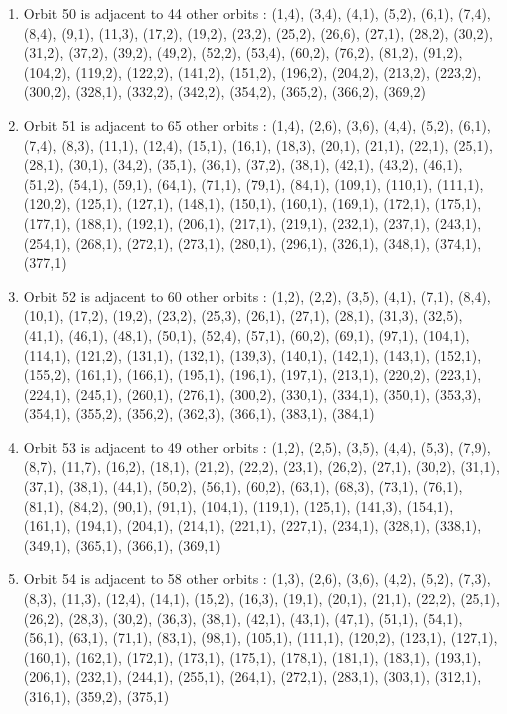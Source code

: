 \documentclass[12pt]{article}
\begin{document}
\begin{enumerate}
\item Orbit 50 is adjacent to 44 other orbits : (1,4), (3,4), (4,1), (5,2), (6,1), (7,4), (8,4), (9,1), (11,3), (17,2), (19,2), (23,2), (25,2), (26,6), (27,1), (28,2), (30,2), (31,2), (37,2), (39,2), (49,2), (52,2), (53,4), (60,2), (76,2), (81,2), (91,2), (104,2), (119,2), (122,2), (141,2), (151,2), (196,2), (204,2), (213,2), (223,2), (300,2), (328,1), (332,2), (342,2), (354,2), (365,2), (366,2), (369,2)
\item Orbit 51 is adjacent to 65 other orbits : (1,4), (2,6), (3,6), (4,4), (5,2), (6,1), (7,4), (8,3), (11,1), (12,4), (15,1), (16,1), (18,3), (20,1), (21,1), (22,1), (25,1), (28,1), (30,1), (34,2), (35,1), (36,1), (37,2), (38,1), (42,1), (43,2), (46,1), (51,2), (54,1), (59,1), (64,1), (71,1), (79,1), (84,1), (109,1), (110,1), (111,1), (120,2), (125,1), (127,1), (148,1), (150,1), (160,1), (169,1), (172,1), (175,1), (177,1), (188,1), (192,1), (206,1), (217,1), (219,1), (232,1), (237,1), (243,1), (254,1), (268,1), (272,1), (273,1), (280,1), (296,1), (326,1), (348,1), (374,1), (377,1)
\item Orbit 52 is adjacent to 60 other orbits : (1,2), (2,2), (3,5), (4,1), (7,1), (8,4), (10,1), (17,2), (19,2), (23,2), (25,3), (26,1), (27,1), (28,1), (31,3), (32,5), (41,1), (46,1), (48,1), (50,1), (52,4), (57,1), (60,2), (69,1), (97,1), (104,1), (114,1), (121,2), (131,1), (132,1), (139,3), (140,1), (142,1), (143,1), (152,1), (155,2), (161,1), (166,1), (195,1), (196,1), (197,1), (213,1), (220,2), (223,1), (224,1), (245,1), (260,1), (276,1), (300,2), (330,1), (334,1), (350,1), (353,3), (354,1), (355,2), (356,2), (362,3), (366,1), (383,1), (384,1)
\item Orbit 53 is adjacent to 49 other orbits : (1,2), (2,5), (3,5), (4,4), (5,3), (7,9), (8,7), (11,7), (16,2), (18,1), (21,2), (22,2), (23,1), (26,2), (27,1), (30,2), (31,1), (37,1), (38,1), (44,1), (50,2), (56,1), (60,2), (63,1), (68,3), (73,1), (76,1), (81,1), (84,2), (90,1), (91,1), (104,1), (119,1), (125,1), (141,3), (154,1), (161,1), (194,1), (204,1), (214,1), (221,1), (227,1), (234,1), (328,1), (338,1), (349,1), (365,1), (366,1), (369,1)
\item Orbit 54 is adjacent to 58 other orbits : (1,3), (2,6), (3,6), (4,2), (5,2), (7,3), (8,3), (11,3), (12,4), (14,1), (15,2), (16,3), (19,1), (20,1), (21,1), (22,2), (25,1), (26,2), (28,3), (30,2), (36,3), (38,1), (42,1), (43,1), (47,1), (51,1), (54,1), (56,1), (63,1), (71,1), (83,1), (98,1), (105,1), (111,1), (120,2), (123,1), (127,1), (160,1), (162,1), (172,1), (173,1), (175,1), (178,1), (181,1), (183,1), (193,1), (206,1), (232,1), (244,1), (255,1), (264,1), (272,1), (283,1), (303,1), (312,1), (316,1), (359,2), (375,1)

\end{enumerate}
\end{document}
